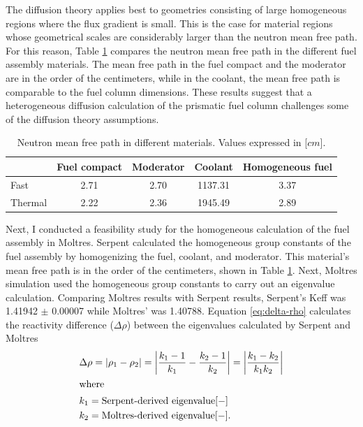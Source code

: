The diffusion theory applies best to geometries consisting of large homogeneous regions where the flux gradient is small.
This is the case for material regions whose geometrical scales are considerably larger than the neutron mean free path.
For this reason, Table \ref{tab:mfp} compares the neutron mean free path in the different fuel assembly materials.
The mean free path in the fuel compact and the moderator are in the order of the centimeters, while in the coolant, the mean free path is comparable to the fuel column dimensions.
These results suggest that a heterogeneous diffusion calculation of the prismatic fuel column challenges some of the diffusion theory assumptions.

\begin{table}[htbp!]
  \centering
  \caption{Neutron mean free path in different materials. Values expressed in [$cm$].}
  \begin{tabular}{lcccc}
  \toprule
              & Fuel compact  & Moderator  & Coolant  & Homogeneous fuel \\
  \midrule
  Fast  		  & 2.71 & 2.70 & 1137.31 & 3.37 \\
  Thermal		  & 2.22 & 2.36 & 1945.49 & 2.89 \\
  \bottomrule
  \end{tabular}
  \label{tab:mfp}
\end{table}

Next, I conducted a feasibility study for the homogeneous calculation of the fuel assembly in Moltres.
Serpent calculated the homogeneous group constants of the fuel assembly by homogenizing the fuel, coolant, and moderator.
This material's mean free path is in the order of the centimeters, shown in Table \ref{tab:mfp}.
Next, Moltres simulation used the homogeneous group constants to carry out an eigenvalue calculation.
Comparing Moltres results with Serpent results, Serpent's \gls{Keff} was 1.41942 $\pm$ 0.00007 while Moltres' was 1.40788.
Equation \ref{eq:delta-rho} calculates the reactivity difference ($\Delta \rho$) between the eigenvalues calculated by Serpent and Moltres
\begin{align}
  & \Delta \rho = \left| \rho_1 - \rho_2 \right| = \left| \frac{k_1-1}{k_1} - \frac{k_2-1}{k_2} \right| = \left| \frac{k_1-k_2}{k_1 k_2} \right| \label{eq:delta-rho} \\
  \intertext{where}
  & k_1 = \mbox{Serpent-derived eigenvalue} [-] \notag \\
  & k_2 = \mbox{Moltres-derived eigenvalue} [-]. \notag
\end{align}

